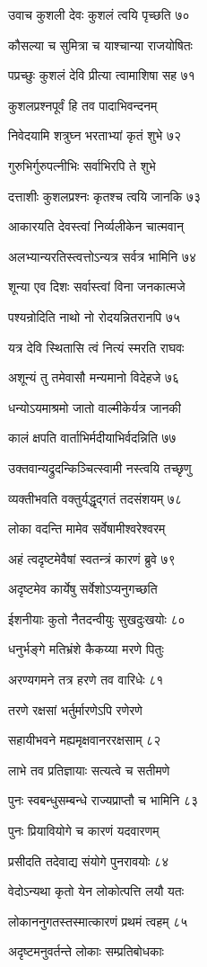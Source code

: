 उवाच कुशली देवः कुशलं त्वयि पृच्छति ७०

कौसल्या च सुमित्रा च याश्चान्या राजयोषितः

पप्रच्छुः कुशलं देवि प्रीत्या त्वामाशिषा सह ७१

कुशलप्रश्नपूर्वं हि तव पादाभिवन्दनम्

निवेदयामि शत्रुघ्न भरताभ्यां कृतं शुभे ७२

गुरुभिर्गुरुपत्नीभिः सर्वाभिरपि ते शुभे

दत्ताशीः कुशलप्रश्नः कृतश्च त्वयि जानकि ७३

आकारयति देवस्त्वां निर्व्यलीकेन चात्मवान्

अलभ्यान्यरतिस्त्वत्तोऽन्यत्र सर्वत्र भामिनि ७४

शून्या एव दिशः सर्वास्त्वां विना जनकात्मजे

पश्यन्रोदिति नाथो नो रोदयन्नितरानपि ७५

यत्र देवि स्थितासि त्वं नित्यं स्मरति राघवः

अशून्यं तु तमेवासौ मन्यमानो विदेहजे ७६

धन्योऽयमाश्रमो जातो वाल्मीकेर्यत्र जानकी

कालं क्षपति वार्ताभिर्मदीयाभिर्वदन्निति ७७

उक्तवान्यद्रुदन्किञ्चित्स्वामी नस्त्वयि तच्छृणु

व्यक्तीभवति वक्तुर्यद्धृद्गतं तदसंशयम् ७८

लोका वदन्ति मामेव सर्वेषामीश्वरेश्वरम्

अहं त्वदृष्टमेवैषां स्वतन्त्रं कारणं ब्रुवे ७९

अदृष्टमेव कार्येषु सर्वेशोऽप्यनुगच्छति

ईशनीयाः कुतो नैतदन्वीयुः सुखदुःखयोः ८०

धनुर्भङ्गे मतिभ्रंशे कैकय्या मरणे पितुः

अरण्यगमने तत्र हरणे तव वारिधेः ८१

तरणे रक्षसां भर्तुर्मारणेऽपि रणेरणे

सहायीभवने मह्यमृक्षवानररक्षसाम् ८२

लाभे तव प्रतिज्ञायाः सत्यत्वे च सतीमणे

पुनः स्वबन्धुसम्बन्धे राज्यप्राप्तौ च भामिनि ८३

पुनः प्रियावियोगे च कारणं यदवारणम्

प्रसीदति तदेवाद्य संयोगे पुनरावयोः ८४

वेदोऽन्यथा कृतो येन लोकोत्पत्ति लयौ यतः

लोकाननुगतस्तस्मात्कारणं प्रथमं त्वहम् ८५

अदृष्टमनुवर्तन्ते लोकाः सम्प्रतिबोधकाः

